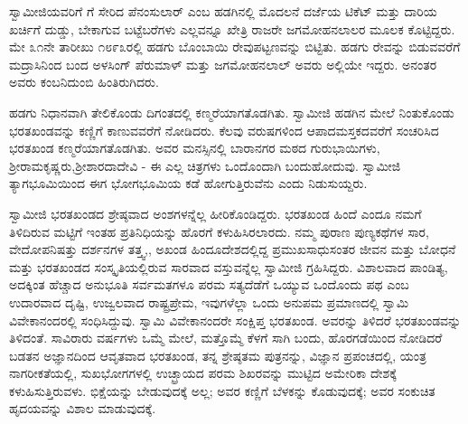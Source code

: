  ಸ್ವಾಮೀಜಿಯವರಿಗೆ  ಗೆ ಸೇರಿದ ಪೆನಂಸುಲಾರ್ ಎಂಬ ಹಡಗಿನಲ್ಲಿ ಮೊದಲನೆ ದರ್ಜೆಯ ಟಿಕೆಟ್ ಮತ್ತು ದಾರಿಯ ಖರ್ಚಿಗೆ ದುಡ್ಡು, ಬೇಕಾಗುವ ಬಟ್ಟೆಬರೆಗಳು ಎಲ್ಲವನ್ನೂ ಖೇತ್ರಿ ರಾಜರೇ ಜಗಮೋಹನಲಾಲರ ಮೂಲಕ ಕೊಟ್ಟಿದ್ದರು. ಮೇ ೩೧ನೇ ತಾರೀಖು ೧೮೯೩ರಲ್ಲಿ ಹಡಗು ಬೊಂಬಾಯಿ ರೇವುಪಟ್ಟಣವನ್ನು ಬಿಟ್ಟಿತು. ಹಡಗು ರೇವನ್ನು ಬಿಡುವವರೆಗೆ ಮದ್ರಾಸಿನಿಂದ ಬಂದ ಅಳಸಿಂಗ್ ಪೆರುಮಾಳ್ ಮತ್ತು ಜಗಮೋಹನಲಾಲ್ ಅವರು ಅಲ್ಲಿಯೇ ಇದ್ದರು. ಅನಂತರ ಅವರು ಕಂಬನಿದುಂಬಿ ಹಿಂತಿರುಗಿದರು. 

 ಹಡಗು ನಿಧಾನವಾಗಿ ತೇಲಿಕೊಂಡು ದಿಗಂತದಲ್ಲಿ ಕಣ್ಮರೆಯಾಗತೊಡಗಿತು. ಸ್ವಾಮೀಜಿ ಹಡಗಿನ ಮೇಲೆ ನಿಂತುಕೊಂಡು ಭರತಖಂಡವನ್ನು ಕಣ್ಣಿಗೆ ಕಾಣುವವರೆಗೆ ನೋಡಿದರು. ಕೆಲವು ವರುಷಗಳಿಂದ ಆಪಾದಮಸ್ತಕದವರೆಗೆ ಸಂಚರಿಸಿದ ಭರತಖಂಡ ಕಣ್ಮರೆಯಾಗತೊಡಗಿತು. ಅವರ ಮನಸ್ಸಿನಲ್ಲಿ ಬಾರಾನಗರ ಮಠದ ಗುರುಭಾಯಿಗಳು, ಶ‍್ರೀರಾಮಕೃಷ್ಣರು,\break ಶ‍್ರೀಶಾರದಾದೇವಿ - ಈ ಎಲ್ಲ ಚಿತ್ರಗಳು ಒಂದೊಂದಾಗಿ ಬಂದುಹೋದುವು. ಸ್ವಾಮೀಜಿ ತ್ಯಾಗಭೂಮಿಯಿಂದ ಈಗ ಭೋಗಭೂಮಿಯ ಕಡೆ ಹೋಗುತ್ತಿರುವೆನು ಎಂದು ನಿಡುಸುಯ್ದರು. 

 ಸ್ವಾಮೀಜಿ ಭರತಖಂಡದ ಶ್ರೇಷ್ಠವಾದ ಅಂಶಗಳನ್ನೆಲ್ಲ ಹೀರಿಕೊಂಡಿದ್ದರು. ಭರತಖಂಡ ಹಿಂದೆ ಎಂದೂ ನಮಗೆ ತಿಳಿದಿರುವ ಮಟ್ಟಿಗೆ ಇಂತಹ ಪ್ರತಿನಿಧಿಯನ್ನು ಹೊರಗೆ ಕಳುಹಿಸಿರಲಾರದು. ನಮ್ಮ ಪುರಾಣ ಪುಣ್ಯಕಥೆಗಳ ಸಾರ, ವೇದೋಪನಿಷತ್ತು ದರ್ಶನಗಳ ತತ್ತ್ವ,, ಅಖಂಡ ಹಿಂದೂದೇಶದಲ್ಲಿದ್ದ ಪ್ರಮುಖಸಾಧುಸಂತರ ಜೀವನ ಮತ್ತು ಬೋಧನೆ ಮತ್ತು ಭರತಖಂಡದ ಸಂಸ್ಕೃತಿಯಲ್ಲಿರುವ ಸಾರವಾದ ವಸ್ತುವನ್ನೆಲ್ಲ ಸ್ವಾಮೀಜಿ ಗ್ರಹಿಸಿದ್ದರು. ವಿಶಾಲವಾದ ಪಾಂಡಿತ್ಯ, ಅದಕ್ಕಿಂತ ಹೆಚ್ಚಾದ ಅನುಭೂತಿ ಸರ್ವಮತಗಳೂ ಪರಮ ಸತ್ಯದೆಡೆಗೆ ಒಯ್ಯುವ ಒಂದೊಂದು ಪಥ ಎಂಬ ಉದಾರವಾದ ದೃಷ್ಟಿ, ಉಜ್ವಲವಾದ ರಾಷ್ಟ್ರಪ್ರೇಮ, ಇವುಗಳೆಲ್ಲಾ ಒಂದು ಅನುಪಮ ಪ್ರಮಾಣದಲ್ಲಿ ಸ್ವಾಮಿ ವಿವೇಕಾನಂದರಲ್ಲಿ ಸಂಧಿಸಿದ್ದುವು. ಸ್ವಾಮಿ ವಿವೇಕಾನಂದರೇ ಸಂಕ್ಷಿಪ್ತ ಭರತಖಂಡ. ಅವರನ್ನು ತಿಳಿದರೆ ಭರತಖಂಡವನ್ನು ತಿಳಿದಂತೆ. ಸಾವಿರಾರು ವರ್ಷಗಳು ಒಮ್ಮೆ ಮೇಲೆ, ಮತ್ತೊಮ್ಮೆ ಕೆಳಗೆ ಸಾಗಿ ಬಂದು, ಹೊರಗಡೆಯಿಂದ ನೋಡಿದರೆ ಬಡತನ ಅಜ್ಞಾನದಿಂದ ಆವೃತವಾದ ಭರತಖಂಡ, ತನ್ನ ಶ್ರೇಷ್ಠತಮ ಪುತ್ರನನ್ನು, ವಿಜ್ಞಾನ ಪ್ರಪಂಚದಲ್ಲಿ, ಯಂತ್ರ ನಾಗರೀಕತೆಯಲ್ಲಿ, ಸುಖಭೋಗಗಳಲ್ಲಿ ಉಚ್ಛ್ರಾಯದ ಪರಮ ಶಿಖರವನ್ನು ಮುಟ್ಟಿದ ಅಮೇರಿಕಾ ದೇಶಕ್ಕೆ ಕಳುಹಿಸುತ್ತಿರುವಳು. ಭಿಕ್ಷೆಯನ್ನು ಬೇಡುವುದಕ್ಕೆ ಅಲ್ಲ; ಅವರ ಕಣ್ಣಿಗೆ ಬೆಳಕನ್ನು ಕೊಡುವುದಕ್ಕೆ; ಅವರ ಸಂಕುಚಿತ ಹೃದಯವನ್ನು ವಿಶಾಲ ಮಾಡುವುದಕ್ಕೆ. 

